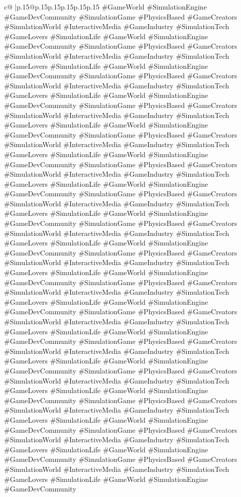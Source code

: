 \documentclass{article}
\begin{document}
{\begin{supertabular}{c@{$\;$}|p{.15\linewidth}@{}p{.15\linewidth}p{.15\linewidth}p{.15\linewidth}p{.15\linewidth}p{.15\linewidth}}
{{{\#GameWorld \#SimulationEngine \#GameDevCommunity \#SimulationGame \#PhysicsBased \#GameCreators \#SimulationWorld \#InteractiveMedia \#GameIndustry \#SimulationTech \#GameLovers \#SimulationLife \#GameWorld \#SimulationEngine \#GameDevCommunity \#SimulationGame \#PhysicsBased \#GameCreators \#SimulationWorld \#InteractiveMedia \#GameIndustry \#SimulationTech \#GameLovers \#SimulationLife \#GameWorld \#SimulationEngine \#GameDevCommunity \#SimulationGame \#PhysicsBased \#GameCreators \#SimulationWorld \#InteractiveMedia \#GameIndustry \#SimulationTech \#GameLovers \#SimulationLife \#GameWorld \#SimulationEngine \#GameDevCommunity \#SimulationGame \#PhysicsBased \#GameCreators \#SimulationWorld \#InteractiveMedia \#GameIndustry \#SimulationTech \#GameLovers \#SimulationLife \#GameWorld \#SimulationEngine \#GameDevCommunity \#SimulationGame \#PhysicsBased \#GameCreators \#SimulationWorld \#InteractiveMedia \#GameIndustry \#SimulationTech \#GameLovers \#SimulationLife \#GameWorld \#SimulationEngine \#GameDevCommunity \#SimulationGame \#PhysicsBased \#GameCreators \#SimulationWorld \#InteractiveMedia \#GameIndustry \#SimulationTech \#GameLovers \#SimulationLife \#GameWorld \#SimulationEngine \#GameDevCommunity \#SimulationGame \#PhysicsBased \#GameCreators \#SimulationWorld \#InteractiveMedia \#GameIndustry \#SimulationTech \#GameLovers \#SimulationLife \#GameWorld \#SimulationEngine \#GameDevCommunity \#SimulationGame \#PhysicsBased \#GameCreators \#SimulationWorld \#InteractiveMedia \#GameIndustry \#SimulationTech \#GameLovers \#SimulationLife \#GameWorld \#SimulationEngine \#GameDevCommunity \#SimulationGame \#PhysicsBased \#GameCreators \#SimulationWorld \#InteractiveMedia \#GameIndustry \#SimulationTech \#GameLovers \#SimulationLife \#GameWorld \#SimulationEngine \#GameDevCommunity \#SimulationGame \#PhysicsBased \#GameCreators \#SimulationWorld \#InteractiveMedia \#GameIndustry \#SimulationTech \#GameLovers \#SimulationLife \#GameWorld \#SimulationEngine \#GameDevCommunity \#SimulationGame \#PhysicsBased \#GameCreators \#SimulationWorld \#InteractiveMedia \#GameIndustry \#SimulationTech \#GameLovers \#SimulationLife \#GameWorld \#SimulationEngine \#GameDevCommunity \#SimulationGame \#PhysicsBased \#GameCreators \#SimulationWorld \#InteractiveMedia \#GameIndustry \#SimulationTech \#GameLovers \#SimulationLife \#GameWorld \#SimulationEngine \#GameDevCommunity \#SimulationGame \#PhysicsBased \#GameCreators \#SimulationWorld \#InteractiveMedia \#GameIndustry \#SimulationTech \#GameLovers \#SimulationLife \#GameWorld \#SimulationEngine \#GameDevCommunity \#SimulationGame \#PhysicsBased \#GameCreators \#SimulationWorld \#InteractiveMedia \#GameIndustry \#SimulationTech \#GameLovers \#SimulationLife \#GameWorld \#SimulationEngine \#GameDevCommunity \#SimulationGame \#PhysicsBased \#GameCreators \#SimulationWorld \#InteractiveMedia \#GameIndustry \#SimulationTech \#GameLovers \#SimulationLife \#GameWorld \#SimulationEngine \#GameDevCommunity \#SimulationGame \#PhysicsBased \#GameCreators \#SimulationWorld \#InteractiveMedia \#GameIndustry \#SimulationTech \#GameLovers \#SimulationLife \#GameWorld \#SimulationEngine \#GameDevCommunity }}}
\end{supertabular}}
\end{document}
